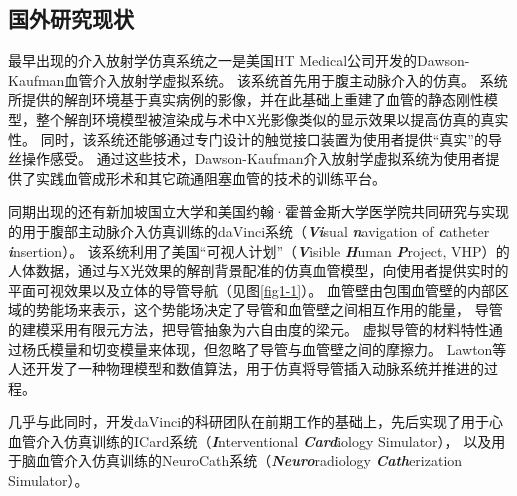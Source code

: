 \subsection{国外研究现状}
\label{sec1-4-1}

最早出现的介入放射学仿真系统之一是美国HT Medical公司开发的Dawson-Kaufman血管介入放射学虚拟系统\cite{Higgins1995DK}\cite{Dawson1996DK}\cite{meglan1996DK}。
该系统首先用于腹主动脉介入的仿真\cite{Wang1998ICard}。
系统所提供的解剖环境基于真实病例的影像，并在此基础上重建了血管的静态刚性模型，整个解剖环境模型被渲染成与术中X光影像类似的显示效果以提高仿真的真实性\cite{Higgins1995DK}。
同时，该系统还能够通过专门设计的触觉接口装置为使用者提供“真实”的导丝操作感受\cite{BroNielsen1997DK}。
通过这些技术，Dawson-Kaufman介入放射学虚拟系统为使用者提供了实践血管成形术和其它疏通阻塞血管的技术的训练平台。

同期出现的还有新加坡国立大学和美国约翰·霍普金斯大学医学院共同研究与实现的用于腹部主动脉介入仿真训练的daVinci系统（\textbf{\textit{Vi}}sual \textbf{\textit{n}}avigation of \textbf{\textit{c}}atheter \textbf{\textit{i}}nsertion\cite{Lawton2000daVinci}）\cite{Anderson1996daVinci}\cite{Anderson1996adaVinci}\cite{Anderson1997daVinci}\cite{Anderson1997adaVinci}。
该系统利用了美国“可视人计划”（\textbf{\textit{V}}isible \textbf{\textit{H}}uman \textbf{\textit{P}}roject, VHP）\cite{vhpweb}的人体数据，通过与X光效果的解剖背景配准的仿真血管模型，向使用者提供实时的平面可视效果以及立体的导管导航\cite{Anderson1998daVinci}（见图\ref{fig1-1}）。
血管壁由包围血管壁的内部区域的势能场来表示，这个势能场决定了导管和血管壁之间相互作用的能量，
导管的建模采用有限元方法，把导管抽象为六自由度的梁元\cite{Chui1996daVinci}\cite{Wang1996daVinci}。
虚拟导管的材料特性通过杨氏模量和切变模量来体现，但忽略了导管与血管壁之间的摩擦力\cite{Anderson1998daVinci}。
Lawton等人\cite{Lawton2000daVinci}还开发了一种物理模型和数值算法，用于仿真将导管插入动脉系统并推进的过程。


几乎与此同时，开发daVinci的科研团队在前期工作的基础上，先后实现了用于心血管介入仿真训练的ICard系统（\textbf{\textit{I}}nterventional \textbf{\textit{Card}}iology Simulator）\cite{Wang1997ICard}\cite{Chui1998ICard}\cite{Wang1998ICard}\cite{Cai2004ICard}\cite{Cai2006ICard}，
以及用于脑血管介入仿真训练的NeuroCath系统（\textbf{\textit{Neuro}}radiology \textbf{\textit{Cath}}erization Simulator）\cite{Ma2000NeuroCath}\cite{Nowinski2000NeuroCath}\cite{Ma2001NeuroCath}\cite{Li2001NeuroCath}\cite{Nowinski2001NeuroCath}\cite{Anderson2001NeuroCath}\cite{Chui2002NeuroCath}\cite{Anderson2002NeuroCath}\cite{Ma2004NeuroCath}\cite{Volkau2005Vessel}\cite{Ma2005NeuroCath}\cite{Ma2006NeuroCath}\cite{Ma2006aNeuroCath}\cite{Ma2007NeuroCath}。

